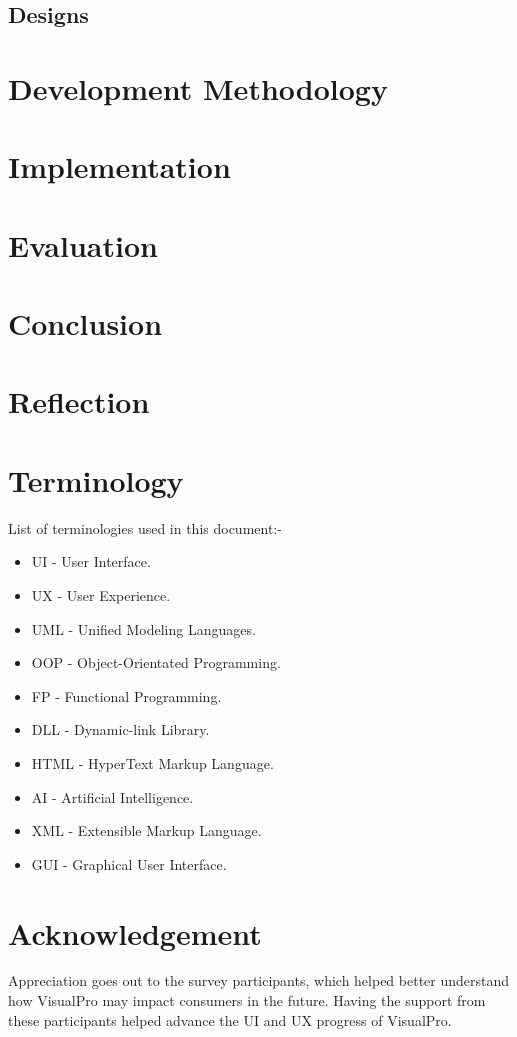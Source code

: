 \documentclass[12pt]{report} %
\begin{document}
			\section{Designs}
				
		\chapter{Development Methodology}

		\chapter{Implementation}
		
		\chapter{Evaluation}

		\chapter{Conclusion}

		\chapter{Reflection}

		\chapter{Terminology}
			List of terminologies used in this document:-
			\begin{itemize}
			\item UI - User Interface.
			\item UX - User Experience.
			\item UML - Unified Modeling Languages.
			\item OOP - Object-Orientated Programming.
			\item FP - Functional Programming.
			\item DLL - Dynamic-link Library.
			\item HTML - HyperText Markup Language.
			\item AI - Artificial Intelligence.
			\item XML - Extensible Markup Language.
			\item GUI - Graphical User Interface.
			\end{itemize}

		\chapter*{Acknowledgement}
			Appreciation goes out to the survey participants, which helped better understand how VisualPro may impact consumers in the future. Having the support from these participants helped advance the UI and UX progress of VisualPro.
\end{document}
